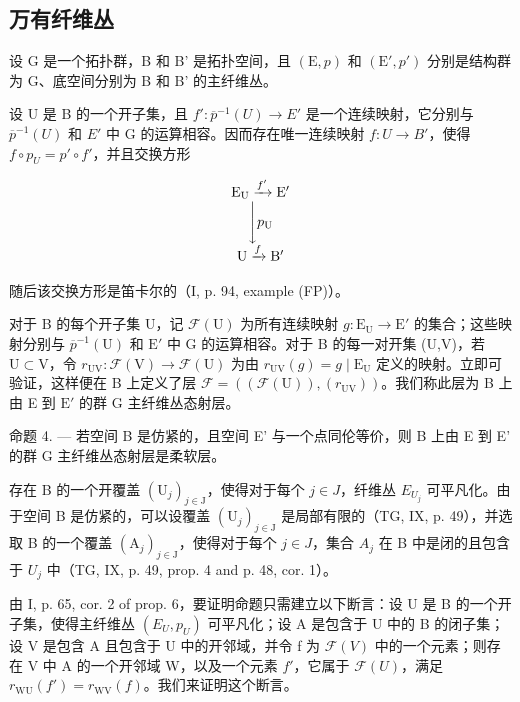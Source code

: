 \subsection{万有纤维丛}

设 G 是一个拓扑群，B 和 B' 是拓扑空间，且 \((\mathrm{E}, p)\) 和 \((\mathrm{E}', p')\) 分别是结构群为 G、底空间分别为 B 和 B' 的主纤维丛。

设 U 是 B 的一个开子集，且 \(f'\colon \overline{p}^{-1}(U) \to E'\) 是一个连续映射，它分别与 \(\overline{p}^{-1}(U)\) 和 \(E'\) 中 G 的运算相容。因而存在唯一连续映射 \(f\colon U \to B'\)，使得 \(f \circ p_{U} = p' \circ f'\)，并且交换方形

\[
\begin{array}{c} \mathrm {E_ {U}} \xrightarrow {f ^ {\prime}} \mathrm {E^ {\prime}} \\ \Biggl \downarrow p _ {\mathrm{U}} \\ \mathrm{U} \xrightarrow {f} \mathrm {B^ {\prime}} \end{array}
\]

随后该交换方形是笛卡尔的（I, p. 94, example (FP)）。

对于 B 的每个开子集 U，记 \(\mathcal{F}(\mathrm{U})\) 为所有连续映射 \(g\colon \mathrm{E}_{\mathrm{U}}\to \mathrm{E}'\) 的集合；这些映射分别与 \(\overline{p}^{-1}(\mathrm{U})\) 和 \(\mathrm{E}'\) 中 G 的运算相容。对于 B 的每一对开集 (U,V)，若 \(\mathrm{U}\subset \mathrm{V}\)，令 \(r_{\mathrm{UV}}\colon \mathcal{F}(\mathrm{V})\to \mathcal{F}(\mathrm{U})\) 为由 \(r_{\mathrm{UV}}(g) = g\mid \mathrm{E}_{\mathrm{U}}\) 定义的映射。立即可验证，这样便在 B 上定义了层 \(\mathcal{F} = ((\mathcal{F}(\mathrm{U})),(r_{\mathrm{UV}}))\)。我们称此层为 B 上由 E 到 \(\mathrm{E}'\) 的群 G 主纤维丛态射层。

命题 4. --- 若空间 B 是仿紧的，且空间 E' 与一个点同伦等价，则 B 上由 E 到 E' 的群 G 主纤维丛态射层是柔软层。

存在 B 的一个开覆盖 \((\mathrm{U}_{j})_{j\in\mathrm{J}}\)，使得对于每个 \(j\in J\)，纤维丛 \(E_{U_{j}}\) 可平凡化。由于空间 B 是仿紧的，可以设覆盖 \((\mathrm{U}_{j})_{j\in\mathrm{J}}\) 是局部有限的（TG, IX, p. 49），并选取 B 的一个覆盖 \((\mathrm{A}_{j})_{j\in\mathrm{J}}\)，使得对于每个 \(j\in J\)，集合 \(A_{j}\) 在 B 中是闭的且包含于 \(U_{j}\) 中（TG, IX, p. 49, prop. 4 and p. 48, cor. 1）。

由 I, p. 65, cor. 2 of prop. 6，要证明命题只需建立以下断言：设 U 是 B 的一个开子集，使得主纤维丛 \((E_{U}, p_{U})\) 可平凡化；设 A 是包含于 U 中的 B 的闭子集；设 V 是包含 A 且包含于 U 中的开邻域，并令 f 为 \(\mathcal{F}(V)\) 中的一个元素；则存在 V 中 A 的一个开邻域 W，以及一个元素 \(f'\)，它属于 \(\mathcal{F}(U)\)，满足 \(r_{\mathrm{WU}}(f') = r_{\mathrm{WV}}(f)\)。我们来证明这个断言。

